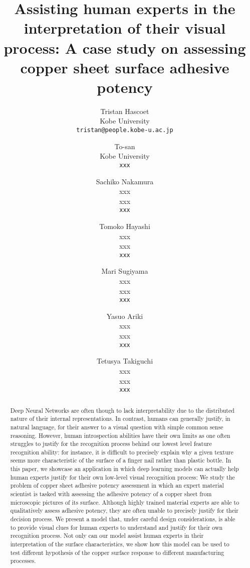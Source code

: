 \documentclass[10pt,twocolumn,letterpaper]{article}
\begin{document}
\title{Assisting human experts in the interpretation of their visual process: A case study on assessing copper sheet surface adhesive potency}%

\author{
Tristan Hascoet\\
Kobe University\\
{\tt\small tristan@people.kobe-u.ac.jp}
\and
To-san\\
Kobe University\\
{\tt\small xxx}
\and
Sachiko Nakamura\\
xxx\\
xxx\\
{\tt\small xxx}
\and
Tomoko Hayashi\\
xxx\\
xxx\\
{\tt\small xxx}
\and
Mari Sugiyama\\
xxx\\
xxx\\
{\tt\small xxx}
\and
Yasuo Ariki\\
xxx\\
xxx\\
{\tt\small xxx}
\and
Tetusya Takiguchi\\
xxx\\
xxx\\
{\tt\small xxx}
}

\maketitle


\begin{abstract}
Deep Neural Networks are often though to lack interpretability due to the distributed nature of their internal representations. In contrast, humans can generally justify, in natural language, for their answer to a visual question with simple common sense reasoning. However, human introspection abilities have their own limits as one often struggles to justify for the recognition process behind our lowest level feature recognition ability: for instance, it is difficult to precisely explain why a given texture seems more characteristic of the surface of a finger nail rather than plastic bottle.
In this paper, we showcase an application in which deep learning models can actually  help human experts justify for their own low-level visual recognition process: We study the problem of copper sheet adhesive potency assessment in which an expert material scientist is tasked with assessing the adhesive potency of a copper sheet from microscopic pictures of its surface. Although highly trained material experts are able to qualitatively assess adhesive potency, they are often unable to precisely justify for their decision process. We present a model that, under careful design considerations, is able to provide visual clues for human experts to understand and justify for their own recognition process. 
Not only can our model assist human experts in their interpretation of the surface characteristics, 
we show how this model can be used to test different hypothesis of the copper surface response to different manufacturing processes. 

\end{abstract}
\end{document}
